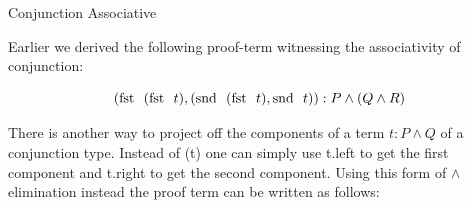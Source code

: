 \documentclass{book}
\begin{document}
    \begin{eg}{Conjunction Associative}
        
        Earlier we derived the following proof-term witnessing the associativity of conjunction:

        $$ (\text{fst } \ (\text{fst } \ t), (\text{snd } \ (\text{fst } \ t), \text{snd } \ t)) : P \land (Q \land R) $$

        There is another way to project off the components of a term $t : P \land Q$ of a conjunction type. Instead of (\fst t) one can simply use t.left to get the first component and t.right to get the second component. Using this form of $\land$ elimination instead the proof term can be written as follows: 
%
%        
    \end{eg}
\end{document}
